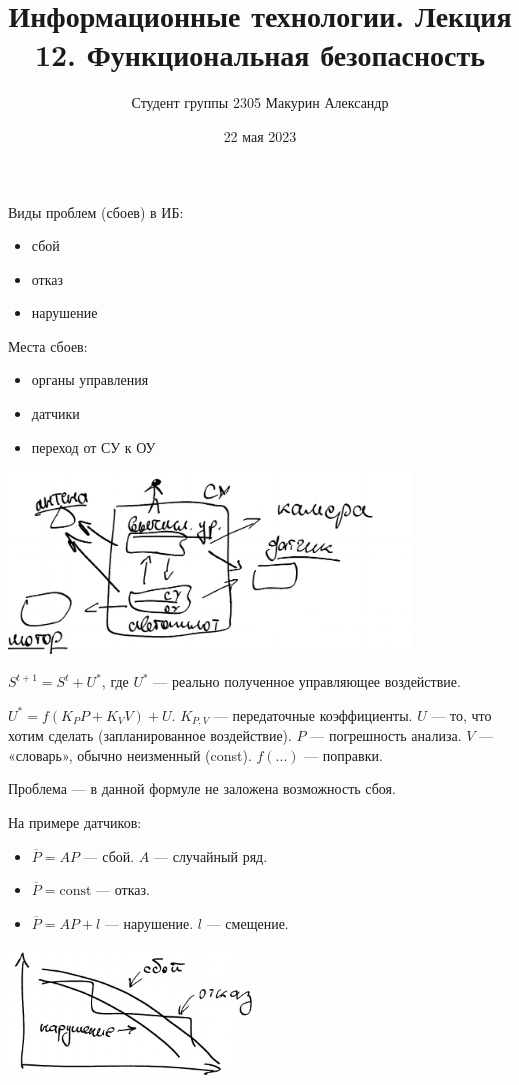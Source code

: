 \documentclass[a4paper]{article}
\title{Информационные технологии. Лекция 12. Функциональная безопасность}
\author{Студент группы 2305 Макурин Александр}
\date{22 мая 2023}
\begin{document}
\maketitle

Виды проблем (сбоев) в ИБ:
\begin{itemize}
    \item сбой
    \item отказ
    \item нарушение
\end{itemize}

Места сбоев:
\begin{itemize}
    \item органы управления
    \item датчики
    \item переход от СУ к ОУ
\end{itemize}

\includegraphics[width=0.8\textwidth]{graphics/pic00.jpg}

$S^{t + 1} = S^t + U^*$, где $U^*$ — реально полученное управляющее воздействие.

$U^* = f(K_PP +K_VV) + U$. $K_{P,V}$ — передаточные коэффициенты. $U$ — то, что хотим сделать (запланированное воздействие). $P$ — погрешность анализа. $V$ — «словарь», обычно неизменный (const). $f(...)$ — поправки.

Проблема — в данной формуле не заложена возможность сбоя.

На примере датчиков:
\begin{itemize}
    \item $\overline{P} = AP$ — сбой. $A$ — случайный ряд.
    \item $\overline{P} = \text{const}$ — отказ.
    \item $\overline{P} = AP + l$ — нарушение. $l$ — смещение.
\end{itemize}

\includegraphics[width=0.5\textwidth]{graphics/pic01.jpg}
\end{document}
